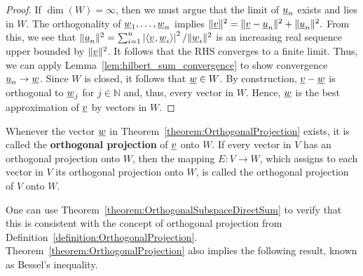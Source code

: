 \begin{proof}
If $\dim(W) = \infty$, then we must argue that the limit of $\underline{u}_n$ exists and lies in $W$.
The orthogonality of $\underline{w}_1,\ldots,\underline{w}_n$ implies $\|\underline{v}\|^2 = \| \underline{v} - \underline{u}_n \|^2 + \|\underline{u}_n\|^2.$
From this, we see that $\| \underline{u}_n \|^2 = \sum_{i=1}^n \left|{\langle  \underline{v}  \mskip1mu ,  \underline{w}_i  \rangle} \right|^2 / \|\underline{w}_i\|^2$ is an increasing real sequence upper bounded by $\|\underline{v}\|^2$.
It follows that the RHS converges to a finite limit.
Thus, we can apply Lemma~\ref{lem:hilbert_sum_convergence} to show convergence $\underline{u}_n \to \underline{w}$.
Since $W$ is closed, it follows that $\underline{w} \in W$.
By construction, $\underline{v} -\underline{w}$ is orthogonal to $\underline{w}_j$ for $j \in \mathbb{N}$ and, thus, every vector in $W$.
Hence, $\underline{w}$ is the best approximation of $\underline{v}$ by vectors in $W$.
\end{proof}

\begin{definition}
Whenever the vector $\underline{w}$ in Theorem~\ref{theorem:OrthogonalProjection} exists, it is called the \textbf{orthogonal projection} of $\underline{v}$ onto $W$.
If every vector in $V$ has an orthogonal projection onto $W$, then the mapping $E \colon V \rightarrow W$, which assigns to each vector in $V$ its orthogonal projection onto $W$, is called the orthogonal projection of $V$ onto $W$.
\end{definition}

One can use Theorem~\ref{theorem:OrthogonalSubspaceDirectSum} to verify that this is consistent with the concept of orthogonal projection from Definition~\ref{definition:OrthogonalProjection}.
Theorem~\ref{theorem:OrthogonalProjection} also implies the following result, known as Bessel's inequality.

